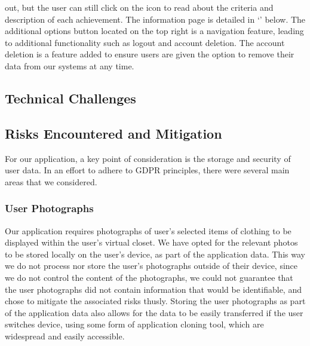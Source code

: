 \documentclass[a4paper, 11pt]{article}
\begin{document}
        out, but the user can still click on the icon to read about the criteria
        and description of each achievement.
        \newline\newline
        The information page is detailed in `' below.
        \newline\newline
        The additional options button located on the top right is a navigation
        feature, leading to additional functionality such as logout and account
        deletion. The account deletion is a feature added to ensure users are
        given the option to remove their data from our systems at any time.

    \subsection{Technical Challenges}
    \subsection{Risks Encountered and Mitigation} 
      For our application, a key point of consideration is the storage and
      security of user data. In an effort to adhere to GDPR principles, there
      were several main areas that we considered.

      \subsubsection{User Photographs}
      Our application requires photographs of user's selected items of clothing
      to be displayed within the user's virtual closet. We have opted for the
      relevant photos to be stored locally on the user's device, as part of the
      application data. This way we do not process nor store the user's
      photographs outside of their device, since we do not control the content
      of the photographs, we could not guarantee that the user photographs did
      not contain information that would be identifiable, and chose to mitigate
      the associated risks thusly.
      \newline\newline
      Storing the user photographs as part of the application data also allows
      for the data to be easily transferred if the user switches device, using
      some form of application cloning tool, which are widespread and easily
      accessible.
\end{document}
